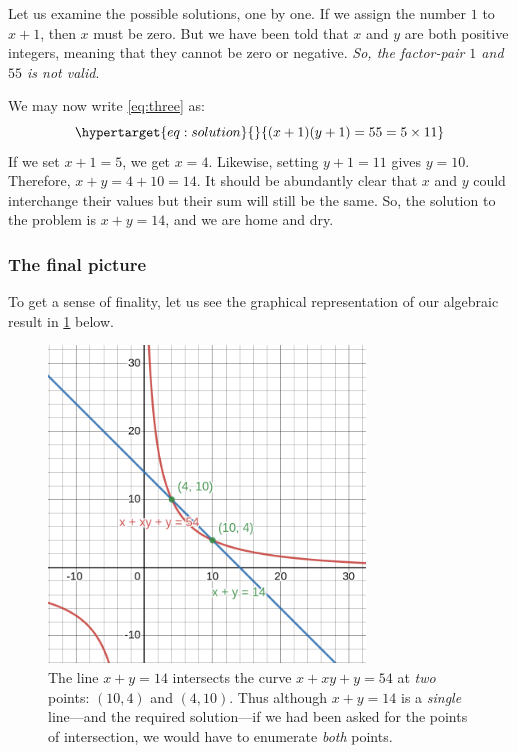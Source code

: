 \documentclass[
  a4paper,
]{article}
\begin{document}
Let us examine the possible solutions, one by one. If we assign the
number \(1\) to \(x + 1\), then \(x\) must be zero. But we have been
told that \(x\) and \(y\) are both positive integers, meaning that they
cannot be zero or negative. \emph{So, the factor-pair \(1\) and \(55\)
is not valid}.

We may now write \cref{eq:three} as:
\begin{equation}\protect\hypertarget{eq:solution}{}{
(x+1)(y+1) = 55 = 5\times 11
}\label{eq:solution}\end{equation} If we set \(x + 1 = 5\), we get
\(x = 4\). Likewise, setting \(y + 1 = 11\) gives \(y = 10\). Therefore,
\(x + y = 4 + 10 = 14\). It should be abundantly clear that \(x\) and
\(y\) could interchange their values but their sum will still be the
same. So, the solution to the problem is \(x + y = 14\), and we are home
and dry.

\hypertarget{the-final-picture}{%
\subsubsection{The final picture}\label{the-final-picture}}

To get a sense of finality, let us see the graphical representation of
our algebraic result in \cref{fig:four} below.

\begin{figure}
\hypertarget{fig:four}{%
\centering
\includegraphics[width=0.75\textwidth,height=\textheight]{images/olympiad-four.png}
\caption{The line \(x + y = 14\) intersects the curve \(x + xy +y = 54\)
at \emph{two} points: \((10, 4)\) and \((4, 10)\). Thus although
\(x + y = 14\) is a \emph{single} line---and the required solution---if
we had been asked for the points of intersection, we would have to
enumerate \emph{both} points.}\label{fig:four}
}
\end{figure}
\end{document}
